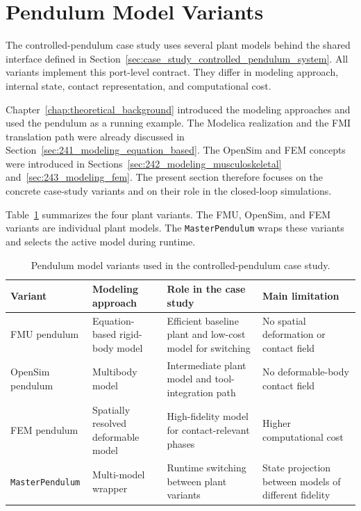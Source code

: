 \section{Pendulum Model Variants}
\label{sec:case_study_pendulum_models}

The controlled-pendulum case study uses several plant models behind the shared interface defined in Section~\ref{sec:case_study_controlled_pendulum_system}.
All variants implement this port-level contract.
They differ in modeling approach, internal state, contact representation, and computational cost.

Chapter~\ref{chap:theoretical_background} introduced the modeling approaches and used the pendulum as a running example.
The Modelica realization and the \ac{FMI} translation path were already discussed in Section~\ref{sec:241_modeling_equation_based}.
The OpenSim and \ac{FEM} concepts were introduced in Sections~\ref{sec:242_modeling_musculoskeletal} and~\ref{sec:243_modeling_fem}.
The present section therefore focuses on the concrete case-study variants and on their role in the closed-loop simulations.

Table~\ref{tab:case_pendulum_variants} summarizes the four plant variants.
The \ac{FMU}, OpenSim, and \ac{FEM} variants are individual plant models.
The \texttt{MasterPendulum} wraps these variants and selects the active model during runtime.

\begin{table}[tbp]
  \centering
  \small
  \caption[Pendulum model variants]{Pendulum model variants used in the controlled-pendulum case study.}
  \label{tab:case_pendulum_variants}
  \begin{tabular}{p{3.1cm}p{3.4cm}p{4.3cm}p{3.7cm}}
    \toprule
    \textbf{Variant} & \textbf{Modeling approach} & \textbf{Role in the case study} & \textbf{Main limitation} \\
    \midrule
    \ac{FMU} pendulum
      & Equation-based rigid-body model
      & Efficient baseline plant and low-cost model for switching
      & No spatial deformation or contact field \\
    \addlinespace
    OpenSim pendulum
      & Multibody model
      & Intermediate plant model and tool-integration path
      & No deformable-body contact field \\
    \addlinespace
    \ac{FEM} pendulum
      & Spatially resolved deformable model
      & High-fidelity model for contact-relevant phases
      & Higher computational cost \\
    \addlinespace
    \texttt{MasterPendulum}
      & Multi-model wrapper
      & Runtime switching between plant variants
      & State projection between models of different fidelity \\
    \bottomrule
  \end{tabular}
\end{table}

